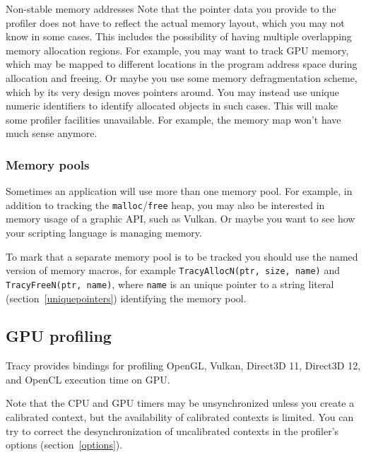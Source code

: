 \documentclass[hidelinks,titlepage,a4paper]{article}
\begin{document}
\begin{bclogo}[
noborder=true,
couleur=black!5,
logo=\bclampe
]{Non-stable memory addresses}
Note that the pointer data you provide to the profiler does not have to reflect the actual memory layout, which you may not know in some cases. This includes the possibility of having multiple overlapping memory allocation regions. For example, you may want to track GPU memory, which may be mapped to different locations in the program address space during allocation and freeing. Or maybe you use some memory defragmentation scheme, which by its very design moves pointers around. You may instead use unique numeric identifiers to identify allocated objects in such cases. This will make some profiler facilities unavailable. For example, the memory map won't have much sense anymore.
\end{bclogo}

\subsubsection{Memory pools}
\label{memorypools}

Sometimes an application will use more than one memory pool. For example, in addition to tracking the \texttt{malloc}/\texttt{free} heap, you may also be interested in memory usage of a graphic API, such as Vulkan. Or maybe you want to see how your scripting language is managing memory.

To mark that a separate memory pool is to be tracked you should use the named version of memory macros, for example \texttt{TracyAllocN(ptr, size, name)} and \texttt{TracyFreeN(ptr, name)}, where \texttt{name} is an unique pointer to a string literal (section~\ref{uniquepointers}) identifying the memory pool.

\subsection{GPU profiling}
\label{gpuprofiling}

Tracy provides bindings for profiling OpenGL, Vulkan, Direct3D 11, Direct3D 12, and OpenCL execution time on GPU.

Note that the CPU and GPU timers may be unsynchronized unless you create a calibrated context, but the availability of calibrated contexts is limited. You can try to correct the desynchronization of uncalibrated contexts in the profiler's options (section~\ref{options}).
\end{document}
